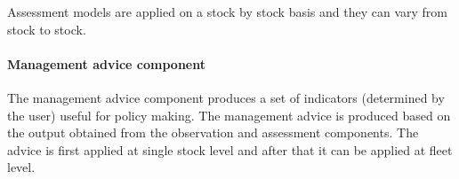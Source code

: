   Assessment models are applied on a stock by stock basis and they can vary from stock to stock.

\paragraph{Management advice component} \hspace{0pt} \smallskip

  The management advice component produces a set of indicators (determined by the user) useful for policy making.
  The management advice is produced based on the output obtained from the observation and assessment components.
  The advice is first applied at single stock level and after that it can be applied at fleet level. 

